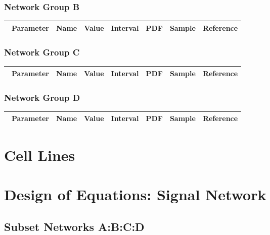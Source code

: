\documentclass[preprint, 8pt]{elsarticle}
\theoremstyle{definition}
\begin{document}
\subsubsection{Network Group B}

\begin{table}[H]\centering
\begin{tabular}{p{1cm}p{1cm}p{1cm}p{1cm}p{1cm}p{1cm}p{4cm}}\
Parameter & Name & Value & Interval & PDF & Sample & Reference \\
\hline
\hline
\end{tabular}
\end{table}

\subsubsection{Network Group C}

\begin{table}[H]\centering
\begin{tabular}{p{1cm}p{1cm}p{1cm}p{1cm}p{1cm}p{1cm}p{4cm}}\
Parameter & Name & Value & Interval & PDF & Sample & Reference \\
\hline
\hline
\end{tabular}
\end{table}

\subsubsection{Network Group D}

\begin{table}[H]\centering
\begin{tabular}{p{1cm}p{1cm}p{1cm}p{1cm}p{1cm}p{1cm}p{4cm}}\
Parameter & Name & Value & Interval & PDF & Sample & Reference \\
\hline
\hline
\end{tabular}
\end{table}

\section{Cell Lines}
\section{Design of Equations: Signal Network}
\subsection{Subset Networks A:B:C:D}
\end{document}
